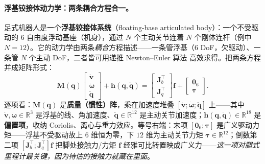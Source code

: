 \paragraph{浮基铰接体动力学：两条耦合方程合一。}
足式机器人是一个\textbf{浮基铰接体系统}（floating-base articulated body）：一个不受驱动的 $6$ 自由度浮动基座（机身），通过 $N$ 个主动关节连着 $N$ 个刚体连杆（例中 $N{=}12$）。它的动力学由两条\emph{耦合}方程描述——一条管浮基（$6$ DoF，欠驱动）、一条管 $N$ 个主动 DoF，二者皆可用递推 Newton--Euler 算法\cite{featherstone2008rigid} 高效求得。把两条方程并成矩阵形式：
\begin{equation}
  \mathbf{M}(\mathbf{q})\begin{bmatrix}\dot{\mathbf{v}}\\\dot{\boldsymbol{\omega}}\\\ddot{\mathbf{q}}\end{bmatrix}+\mathbf{h}(\mathbf{q},\dot{\mathbf{q}})=\begin{bmatrix}\mathbf{J}_b^\top\\\mathbf{J}_q^\top\end{bmatrix}\mathbf{f}+\begin{bmatrix}\mathbf{0}_6\\\boldsymbol{\tau}\end{bmatrix}.
  \label{eq:leg-floating-dyn}
\end{equation}
逐项看：$\mathbf{M}(\mathbf{q})$ 是\textbf{质量（惯性）阵}，乘在加速度堆叠 $[\dot{\mathbf{v}};\dot{\boldsymbol{\omega}};\ddot{\mathbf{q}}]$ 上——其中 $\dot{\mathbf{v}},\dot{\boldsymbol{\omega}}\in\mathbb{R}^3$ 是浮基的线、角加速度、$\ddot{\mathbf{q}}\in\mathbb{R}^{12}$ 是主动关节加速度；$\mathbf{h}(\mathbf{q},\dot{\mathbf{q}})\in\mathbb{R}^{18}$ 是\textbf{偏置项}，收纳 Coriolis、离心与重力效应。等号右端：末项 $[\mathbf{0}_6;\boldsymbol{\tau}]$ 是广义驱动力矩——浮基不受驱动故上 $6$ 维恒为零，下 $12$ 维为主动关节力矩 $\boldsymbol{\tau}\in\mathbb{R}^{12}$；倒数第二项 $[\mathbf{J}_b^\top;\mathbf{J}_q^\top]\mathbf{f}$ 把脚处接触力/力矩 $\mathbf{f}$ 经雅可比转置映成广义力——\emph{这一项对腿式里程计最关键，因为待估的接触力就藏在里面}。

